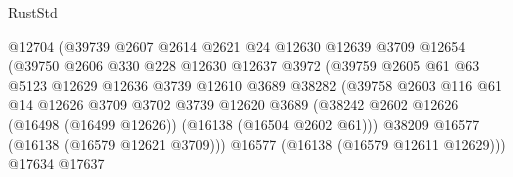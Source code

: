 \begin{lexlean}{RustStd}
\begin{coremodule}
                                      @12704
                                      (@39739
                                        @2607
                                        @2614
                                        @2621
                                        @24
                                        @12630
                                        @12639
                                        @3709
                                        @12654
                                        (@39750
                                          @2606
                                          @330
                                          @228
                                          @12630
                                          @12637
                                          @3972
                                          (@39759
                                            @2605
                                            @61
                                            @63
                                            @5123
                                            @12629
                                            @12636
                                            @3739
                                            @12610
                                            @3689
                                            @38282
                                            (@39758
                                              @2603
                                              @116
                                              @61
                                              @14
                                              @12626
                                              @3709
                                              @3702
                                              @3739
                                              @12620
                                              @3689
                                              (@38242
                                                @2602
                                                @12626
                                                (@16498 (@16499 @12626))
                                                (@16138 (@16504 @2602 @61)))
                                              @38209
                                              @16577
                                              (@16138 (@16579 @12621 @3709)))
                                            @16577
                                            (@16138 (@16579 @12611 @12629)))
                                          @17634
                                          @17637

\end{coremodule}
\end{lexlean}

